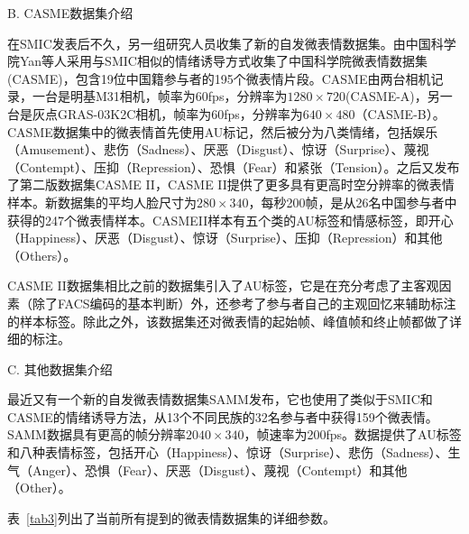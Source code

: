 B. CASME数据集介绍

在SMIC发表后不久，另一组研究人员收集了新的自发微表情数据集。由中国科学院Yan等人采用与SMIC相似的情绪诱导方式收集了中国科学院微表情数据集(CASME)，包含19位中国籍参与者的195个微表情片段。CASME由两台相机记录，一台是明基M31相机，帧率为60fps，分辨率为$1280\times720$(CASME-A)，另一台是灰点GRAS-03K2C相机，帧率为60fps，分辨率为$640\times480$（CASME-B）。CASME数据集中的微表情首先使用AU标记，然后被分为八类情绪，包括娱乐（Amusement）、悲伤（Sadness）、厌恶（Disgust）、惊讶（Surprise）、蔑视（Contempt）、压抑（Repression）、恐惧（Fear）和紧张（Tension）。之后又发布了第二版数据集CASME II，CASME II提供了更多具有更高时空分辨率的微表情样本。新数据集的平均人脸尺寸为$280\times340$，每秒200帧，是从26名中国参与者中获得的247个微表情样本。CASMEII样本有五个类的AU标签和情感标签，即开心（Happiness）、厌恶（Disgust）、惊讶（Surprise）、压抑（Repression）和其他（Others）。

CASME II数据集相比之前的数据集引入了AU标签，它是在充分考虑了主客观因素（除了FACS编码的基本判断）外，还参考了参与者自己的主观回忆来辅助标注的样本标签。除此之外，该数据集还对微表情的起始帧、峰值帧和终止帧都做了详细的标注。

C. 其他数据集介绍

最近又有一个新的自发微表情数据集SAMM发布，它也使用了类似于SMIC和CASME的情绪诱导方法，从13个不同民族的32名参与者中获得159个微表情。SAMM数据具有更高的帧分辨率$2040\times340$，帧速率为200fps。数据提供了AU标签和八种表情标签，包括开心（Happiness）、惊讶（Surprise）、悲伤（Sadness）、生气（Anger）、恐惧（Fear）、厌恶（Disgust）、蔑视（Contempt）和其他（Other）。

表~\ref{tab3}列出了当前所有提到的微表情数据集的详细参数。

